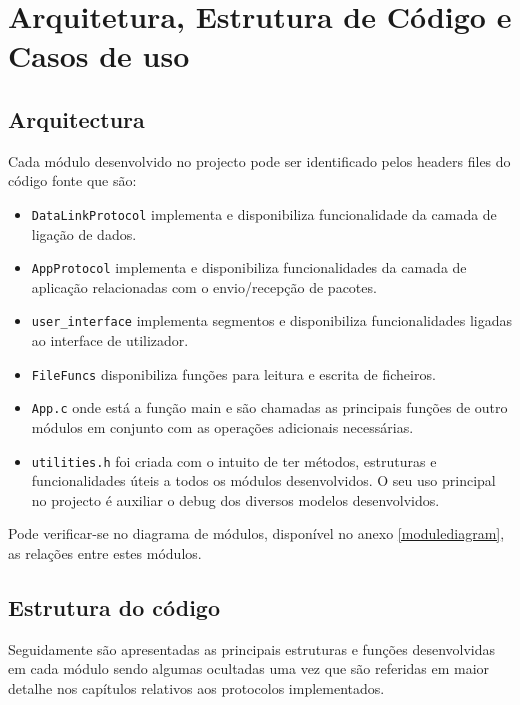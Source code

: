 \documentclass[11pt,a4paper,reqno]{report}
\numberwithin{equation}{section}
\begin{document}
	
\chapter{Arquitetura, Estrutura de Código e Casos de uso}

\section{Arquitectura}

Cada módulo desenvolvido no projecto pode ser identificado pelos headers files do código fonte que são:
\begin{itemize}
\item \verb|DataLinkProtocol| implementa e disponibiliza funcionalidade da camada de ligação de dados. 
\item \verb|AppProtocol|  implementa e disponibiliza funcionalidades da camada de aplicação relacionadas com o envio/recepção de pacotes.
\item \verb|user_interface| implementa segmentos e disponibiliza funcionalidades ligadas ao interface de utilizador. 
\item \verb|FileFuncs| disponibiliza funções para leitura e escrita de ficheiros. 
\item \verb|App.c| onde está a função main e são chamadas as principais funções de outro módulos em conjunto com as operações adicionais necessárias. 
\item \verb|utilities.h| foi criada com o intuito de ter métodos, estruturas e funcionalidades úteis a todos os módulos desenvolvidos. O seu uso principal no projecto é auxiliar o debug dos diversos modelos desenvolvidos.
\end{itemize}
Pode verificar-se no diagrama de módulos, disponível no anexo \ref{modulediagram}, as relações entre estes módulos.

\section{Estrutura do código}

Seguidamente são apresentadas as principais estruturas e funções desenvolvidas em cada módulo sendo algumas ocultadas uma vez que são referidas em maior detalhe nos capítulos relativos aos protocolos implementados.
\end{document}
